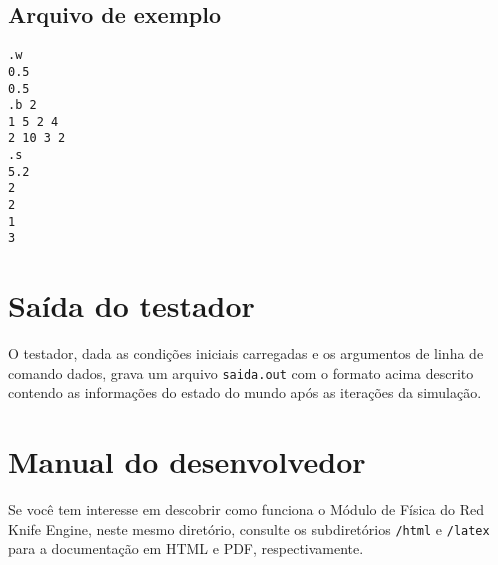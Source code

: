 \documentclass[]{paper}
\begin{document}
\subsection{Arquivo de exemplo}
\texttt{.w\\
0.5\\
0.5\\
.b 2\\
1 5 2 4\\
2 10 3 2\\
.s\\
5.2\\
2\\
2\\
1\\
3}


\section{Saída do testador}
O testador, dada as condições iniciais carregadas e os argumentos de linha de comando dados, grava um arquivo \texttt{saida.out} com o formato acima descrito contendo as informações do estado do mundo após as iterações da simulação.

\section{Manual do desenvolvedor}
Se você tem interesse em descobrir como funciona o Módulo de Física do Red Knife Engine, neste mesmo diretório, consulte os subdiretórios \texttt{/html} e \texttt{/latex} para a documentação em HTML e PDF, respectivamente.
\end{document}
